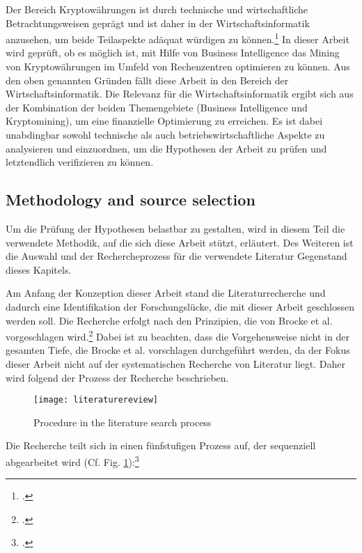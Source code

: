 Der Bereich Kryptowährungen ist durch technische und wirtschaftliche Betrachtungsweisen geprägt und ist daher in der Wirtschaftsinformatik
anzusehen, um beide Teilaspekte adäquat würdigen zu können.\footcite[Cf.][]{derks2018chaining} In dieser Arbeit wird geprüft,
ob es möglich ist, mit Hilfe von Business Intelligence das Mining von Kryptowährungen im Umfeld von Rechenzentren optimieren
zu können. Aus den oben genannten Gründen fällt diese Arbeit in den Bereich der Wirtschaftsinformatik. Die Relevanz für
die Wirtschaftsinformatik ergibt sich aus der Kombination der beiden Themengebiete (Business Intelligence und Kryptomining), um eine
finanzielle Optimierung zu erreichen. Es ist dabei unabdingbar sowohl technische als auch betriebswirtschaftliche Aspekte zu analysieren
und einzuordnen, um die Hypothesen der Arbeit zu prüfen und letztendlich verifizieren zu können.

\subsection{Methodology and source selection} \label{toc:methodikundquellenauswahl}

Um die Prüfung der Hypothesen belastbar zu gestalten, wird in diesem Teil die verwendete Methodik, auf die sich diese Arbeit stützt, erläutert.
Des Weiteren ist die Auswahl und der Rechercheprozess für die verwendete Literatur Gegenstand dieses Kapitels. 

Am Anfang der Konzeption dieser Arbeit stand die Literaturrecherche und dadurch eine Identifikation der Forschungslücke, die mit dieser Arbeit
geschlossen werden soll. Die Recherche erfolgt nach den Prinzipien, die von Brocke et al. vorgeschlagen wird.\footcite[Cf.][]{brocke2009reconstructing}
Dabei ist zu beachten, dass die Vorgehensweise nicht in der gesamten Tiefe, die Brocke et al. vorschlagen durchgeführt werden, da der
Fokus dieser Arbeit nicht auf der systematischen Recherche von Literatur liegt. Daher wird folgend der Prozess der Recherche beschrieben. 

\begin{figure}[H] 
    \caption{Procedure in the literature search process} 
    \texttt{[image: literaturereview]} 
    \label{figure:literaturereview} 
    \\ 
    \cite[Source: Based on][Fig. 3]{brocke2009reconstructing} 
\end{figure} 

Die Recherche teilt sich in einen fünfstufigen Prozess auf, der sequenziell abgearbeitet wird
(Cf. Fig. \ref{figure:literaturereview}):\footcite[Cf.][pp. 2211]{brocke2009reconstructing} 

